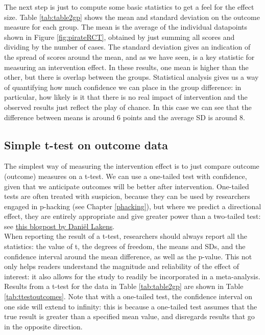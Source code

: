 \documentclass{krantz}
\begin{document}
The next step is just to compute some basic statistics to get a feel for the effect size. Table \ref{tab:table2gp} shows the mean and standard deviation on the outcome measure for each group. The mean is the average of the individual datapoints shown in Figure \ref{fig:pirateRCT}, obtained by just summing all scores and dividing by the number of cases. The standard deviation gives an indication of the spread of scores around the mean, and as we have seen, is a key statistic for measuring an intervention effect. In these results, one mean is higher than the other, but there is overlap between the groups. Statistical analysis gives us a way of quantifying how much confidence we can place in the group difference: in particular, how likely is it that there is no real impact of intervention and the observed results just reflect the play of chance. In this case we can see that the difference between means is around 6 points and the average SD is around 8.

\hypertarget{simple-t-test-on-outcome-data}{%
\subsection{Simple t-test on outcome data}\label{simple-t-test-on-outcome-data}}

The simplest way of measuring the intervention effect is to just compare outcome (outcome) measures on a t-test. We can use a one-tailed test with confidence, given that we anticipate outcomes will be better after intervention. One-tailed tests are often treated with suspicion, because they can be used by researchers engaged in p-hacking (see Chapter \ref{phacking}), but where we predict a directional effect, they are entirely appropriate and give greater power than a two-tailed test: see \href{http://daniellakens.blogspot.com/2016/03/one-sided-tests-efficient-and-underused.html}{this blogpost by Daniël Lakens}.\\
When reporting the result of a t-test, researchers should always report all the statistics: the value of t, the degrees of freedom, the means and SDs, and the confidence interval around the mean difference, as well as the p-value. This not only helps readers understand the magnitude and reliability of the effect of interest: it also allows for the study to readily be incorporated in a meta-analysis. Results from a t-test for the data in Table \ref{tab:table2gp} are shown in Table \ref{tab:ttestoutcomes}. Note that with a one-tailed test, the confidence interval on one side will extend to infinity: this is because a one-tailed test assumes that the true result is greater than a specified mean value, and disregards results that go in the opposite direction.
\end{document}
